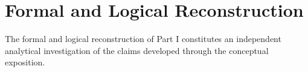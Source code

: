 























\section*{Formal and Logical Reconstruction}

The formal and logical reconstruction of Part I constitutes
an independent analytical investigation of the claims
developed through the conceptual exposition.

